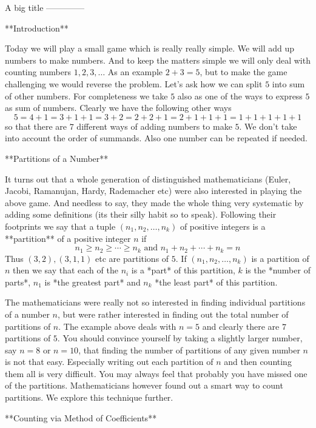 A big title
--------------

**Introduction**

Today we will play a small game which is really really simple. We will add up numbers to make numbers. And to keep the matters simple we will only deal with counting numbers $1, 2, 3, \ldots$ As an example $2 + 3 = 5$, but to make the game challenging we would reverse the problem. Let's ask how we can split $5$ into sum of other numbers. For completeness we take $5$ also as one of the ways to express $5$ as sum of numbers. Clearly we have the following other ways $$5 = 4 + 1 = 3 + 1 + 1 = 3 + 2 = 2 + 2 + 1 = 2 + 1 + 1 + 1 = 1 + 1 + 1 + 1 + 1$$ so that there are $7$ different ways of adding numbers to make $5$. We don't take into account the order of summands. Also one number can be repeated if needed.

**Partitions of a Number**

It turns out that a whole generation of distinguished mathematicians (Euler, Jacobi, Ramanujan, Hardy, Rademacher etc) were also interested in playing the above game. And needless to say, they made the whole thing very systematic by adding some definitions (its their silly habit so to speak). Following their footprints we say that a tuple $(n_{1}, n_{2}, \ldots, n_{k})$ of positive integers is a **partition** of a positive integer $n$ if $$n_{1} \geq n_{2} \geq \cdots \geq n_{k}\text{ and }n_{1} + n_{2} + \cdots + n_{k} = n$$ Thus $(3, 2), (3, 1, 1)$ etc are partitions of $5$. If $(n_{1}, n_{2}, \ldots, n_{k})$ is a partition of $n$ then we say that each of the $n_{i}$ is a *part* of this partition, $k$ is the *number of parts*, $n_{1}$ is *the greatest part* and $n_{k}$ *the least part* of this partition.

The mathematicians were really not so interested in finding individual partitions of a number $n$, but were rather interested in finding out the total number of partitions of $n$. The example above deals with $n = 5$ and clearly there are $7$ partitions of $5$. You should convince yourself by taking a slightly larger number, say $n = 8$ or $n = 10$, that finding the number of partitions of any given number $n$ is not that easy. Especially writing out each partition of $n$ and then counting them all is very difficult. You may always feel that probably you have missed one of the partitions. Mathematicians however found out a smart way to count partitions. We explore this technique further.

**Counting via Method of Coefficients**

